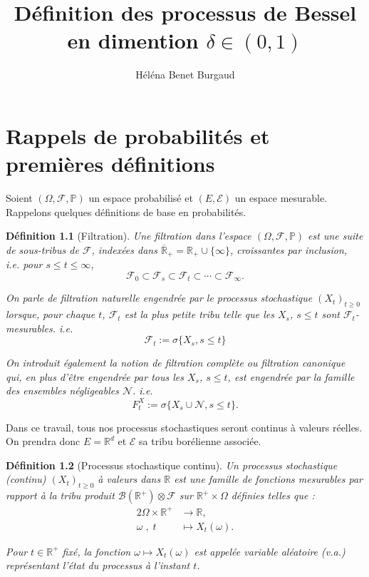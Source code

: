 \documentclass[openany]{book}
\title{Définition des processus de Bessel en dimention $\delta \in (0,1)$}
\author{Héléna Benet Burgaud}
\newcommand{\F}{\mathscr{F}}
\newcommand{\N}{\mathscr{N}}
\newcommand{\carE}{\mathscr{E}}
\renewcommand{\P}{\mathds{P}}
\newcommand{\R}{\mathbb{R}}
\newcommand{\1}{\mathbbm{1}}
\theoremstyle{thmfont}
\theoremstyle{deffont}
\newtheorem{definition}[definition]{Définition}
\theoremstyle{thmfont}
\theoremstyle{deffont}
\begin{document}

\maketitle
\tableofcontents
\clearpage
{} %
\setcounter{page}{1}
\let\cleardoublepage\relax

\chapter{Rappels de probabilités et premières définitions}

Soient $(\Omega, \F, \P )$ un espace probabilisé et $(E, \carE)$ un espace mesurable. Rappelons quelques définitions de base en probabilités.

\begin{definition}[Filtration] Une \textit{filtration} dans l'espace $(\Omega, \F, \P )$ est une suite de sous-tribus de $\F$, indexées dans $\overline{\R}_+ = \R_+ \cup \{\infty\}$, croissantes par inclusion, \\
i.e. pour $s \leq t \leq \infty$,
$$\F_0 \subset \F_s \subset \F_t\subset \cdots \subset \F_\infty .$$

On parle de \textit{filtration naturelle} engendrée par le processus stochastique $(X_t)_{t\geq0}$ lorsque, pour chaque $t$, $\F_t$ est la plus petite tribu telle que les $X_s$, $s\leq t$ sont $\F_t$-mesurables. i.e.
$$\F_t := \sigma\{X_s, s\leq t\}$$

On introduit également la notion de \textit{filtration complète} ou
\textit{filtration canonique} qui, en plus d'être engendrée par tous les $X_s$, $s \leq t$, est engendrée par la famille des ensembles négligeables $\N$. i.e.
$$F^X_t := \sigma\{X_s\cup \N, s\leq t\}.$$

\label{def:filtration}
\end{definition}
Dans ce travail, tous nos processus stochastiques seront continus à valeurs réelles. On prendra donc $E = \R^d$ et $\carE$ sa tribu borélienne associée.

\begin{definition}[Processus stochastique continu]
  Un \textit{processus stochastique (continu)} $(X_t)_{t \ge 0}$ à valeurs dans $\mathbb{R}$ est une famille de fonctions mesurables par rapport à la tribu produit $\mathcal{B}(\mathbb{R}^+) \otimes \mathcal{F}$ sur $\mathbb{R}^+ \times \Omega$ définies telles que :
  \begin{alignat*}{2}
    \Omega\times \R^+ &\rightarrow \R, \\
    \omega\;,\; t\quad &\mapsto X_t(\omega).
  \end{alignat*}
  
  Pour $t \in \mathbb{R}^+$ fixé, la fonction $\omega \mapsto X_t(\omega)$ est appelée \textit{variable aléatoire} (v.a.) représentant l’état du processus à l’instant $t$.
\end{definition}
\end{document}
